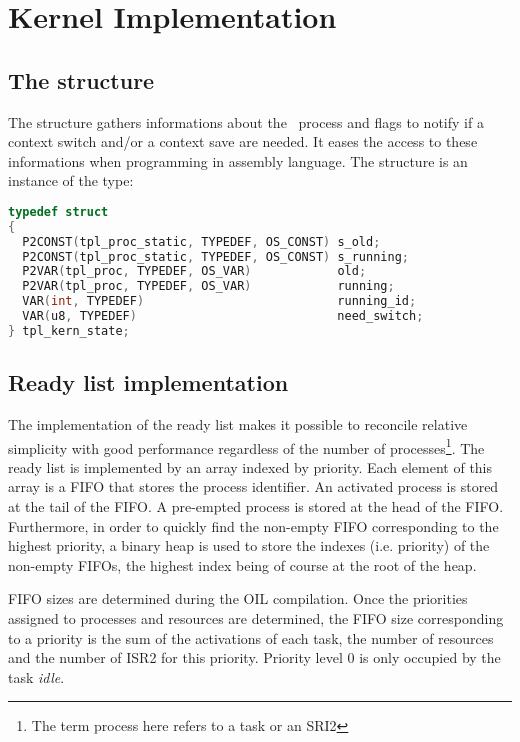 
\chapter{Kernel Implementation}

\section{The  structure}

The  structure gathers informations about the \RUNNING\ process and flags to notify if a context switch and/or a context save are needed. It eases the access to these informations when programming in assembly language. The  structure is an instance of the  type:

\begin{lstlisting}[language=C]
typedef struct 
{
  P2CONST(tpl_proc_static, TYPEDEF, OS_CONST) s_old;
  P2CONST(tpl_proc_static, TYPEDEF, OS_CONST) s_running;
  P2VAR(tpl_proc, TYPEDEF, OS_VAR)            old;
  P2VAR(tpl_proc, TYPEDEF, OS_VAR)            running;
  VAR(int, TYPEDEF)                           running_id;
  VAR(u8, TYPEDEF)                            need_switch;
} tpl_kern_state;
\end{lstlisting}

\section{Ready list implementation}

The implementation of the ready list makes it possible to reconcile relative simplicity with good performance regardless of the number of processes\footnote{The term process here refers to a task or an SRI2}. The ready list is implemented by an array indexed by priority. Each element of this array is a FIFO that stores the process identifier. An activated process is stored at the tail of the FIFO. A pre-empted process is stored at the head of the FIFO. Furthermore, in order to quickly find the non-empty FIFO corresponding to the highest priority, a binary heap is used to store the indexes (i.e. priority) of the non-empty FIFOs, the highest index being of course at the root of the heap.
 
FIFO sizes are determined during the OIL compilation. Once the priorities assigned to processes and resources are determined, the FIFO size corresponding to a priority is the sum of the activations of each task, the number of resources and the number of ISR2 for this priority. Priority level 0 is only occupied by the task \emph{idle}.

